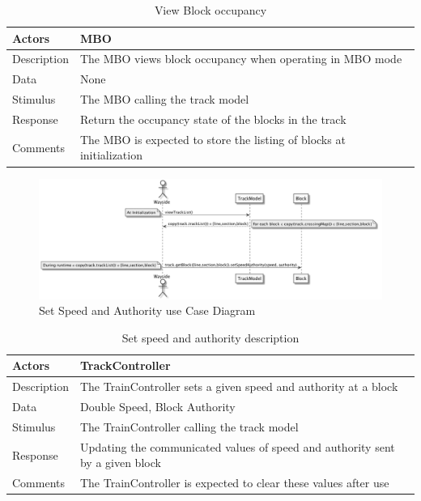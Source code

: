 \documentclass[]{article}
\begin{document}
\begin{table}[H]
	\centering
	\caption{View Block occupancy}
	\begin{tabular}{|l|l|}
		\hline
		Actors & \parbox[t]{10cm}{MBO} \\ \hline
		Description & \parbox[t]{10cm}{The MBO views block occupancy when operating in MBO mode} \\ \hline
		Data &  \parbox[t]{10cm}{None} \\ \hline
		Stimulus &  \parbox[t]{10cm}{The MBO calling the track model} \\ \hline
		Response & \parbox[t]{10cm}{Return the occupancy state of the blocks in the track}\\ \hline
		Comments & \parbox[t]{10cm}{The MBO is expected to store the listing of blocks at initialization}  \\ \hline
	\end{tabular}
\end{table}

\begin{figure}[H]
	\centering
	\includegraphics[scale=.5]{setSpeedAuthority.png}
	\caption{Set Speed and Authority use Case Diagram}
\end{figure}
\begin{table}[H]
	\centering
	\caption{Set speed and authority description}
	\begin{tabular}{|l|l|}
		\hline
		Actors & \parbox[t]{10cm}{TrackController} \\ \hline
		Description & \parbox[t]{10cm}{The TrainController sets a given speed and authority at a block} \\ \hline
		Data &  \parbox[t]{10cm}{Double Speed, Block Authority} \\ \hline
		Stimulus &  \parbox[t]{10cm}{The TrainController calling the track model} \\ \hline
		Response & \parbox[t]{10cm}{Updating the communicated values of speed and authority sent by a given block}\\ \hline
		Comments & \parbox[t]{10cm}{The TrainController is expected to clear these values after use}  \\ \hline
	\end{tabular}
\end{table}
\end{document}
